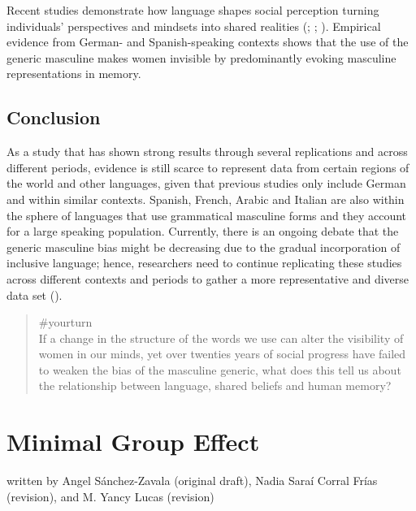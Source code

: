 \documentclass[
  letterpaper,
]{book}
\begin{document}
Recent studies demonstrate how language shapes social perception turning
individuals' perspectives and mindsets into shared realities
(;
;
). Empirical
evidence from German- and Spanish-speaking contexts shows that the use
of the generic masculine makes women invisible by predominantly evoking
masculine representations in memory.

\section{Conclusion}\label{conclusion-15}

As a study that has shown strong results through several replications
and across different periods, evidence is still scarce to represent data
from certain regions of the world and other languages, given that
previous studies only include German and within similar contexts.
Spanish, French, Arabic and Italian are also within the sphere of
languages that use grammatical masculine forms and they account for a
large speaking population. Currently, there is an ongoing debate that
the generic masculine bias might be decreasing due to the gradual
incorporation of inclusive language; hence, researchers need to continue
replicating these studies across different contexts and periods to
gather a more representative and diverse data set
().

\begin{quote}
{\#yourturn}\\
If a change in the structure of the words we use can alter the
visibility of women in our minds, yet over twenties years of social
progress have failed to weaken the bias of the masculine generic, what
does this tell us about the relationship between language, shared
beliefs and human memory?
\end{quote}


\chapter{\texorpdfstring{{Minimal Group
Effect}}{Minimal Group Effect}}\label{minimal-group-effect}

{written by Angel Sánchez-Zavala (original draft), Nadia Saraí Corral
Frías (revision), and M. Yancy Lucas (revision)}
\end{document}

